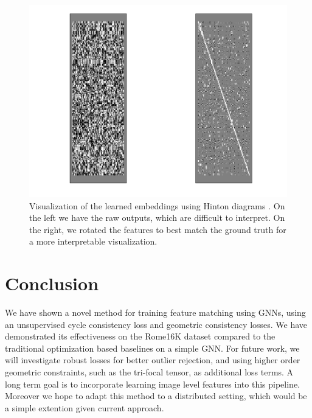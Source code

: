 \documentclass[10pt,twocolumn,letterpaper]{article}
\begin{document}
\begin{figure}[t]
\begin{center}
  \includegraphics[width=0.8\linewidth]{figures-EmbeddingsViz.png}
  \end{center}
     \caption{
         Visualization of the learned embeddings using Hinton diagrams \cite{bremner1994hinton}.
         On the left we have the raw outputs, which are difficult to interpret.
         On the right, we rotated the features to best match the ground truth for a more interpretable visualization.
     }
  \label{fig:onecol}
  \label{fig:embeddingsviz}
\end{figure}
\section{Conclusion}

We have shown a novel method for training feature matching using GNNs, using an unsupervised cycle consistency loss and geometric consistency losses.
We have demonstrated its effectiveness on the Rome16K dataset compared to the traditional optimization based baselines on a simple GNN.
For future work, we will investigate robust losses for better outlier rejection, and using higher order geometric constraints, such as the tri-focal tensor, as additional loss terms.
A long term goal is to incorporate learning image level features into this pipeline.
Moreover we hope to adapt this method to a distributed setting, which would be a simple extention given current approach.

% 
{\small


}
\end{document}
